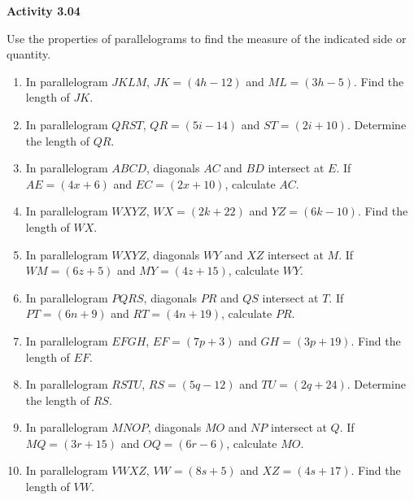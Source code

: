 \vspace{0.3ex}
\noindent\textbf{Activity 3.04}

\vspace{0.2ex}

\noindent Use the properties of parallelograms to find the measure of the indicated side or quantity.

\begin{enumerate}[label=\color{blue}\arabic*.]
    \item In parallelogram \(JKLM\), \(JK = (4h - 12)\) and \(ML = (3h - 5)\). Find the length of \(JK\).
    \item In parallelogram \(QRST\), \(QR = (5i - 14)\) and \(ST = (2i + 10)\). Determine the length of \(QR\).
    \item In parallelogram \(ABCD\), diagonals \(AC\) and \(BD\) intersect at \(E\). If \(AE = (4x + 6)\) and \(EC = (2x + 10)\), calculate \(AC\).
    \item In parallelogram \(WXYZ\), \(WX = (2k + 22)\) and \(YZ = (6k - 10)\). Find the length of \(WX\).
    \item In parallelogram \(WXYZ\), diagonals \(WY\) and \(XZ\) intersect at \(M\). If \(WM = (6z + 5)\) and \(MY = (4z + 15)\), calculate \(WY\).
    \item In parallelogram \(PQRS\), diagonals \(PR\) and \(QS\) intersect at \(T\). If \(PT = (6n + 9)\) and \(RT = (4n + 19)\), calculate \(PR\).
    \item In parallelogram \(EFGH\), \(EF = (7p + 3)\) and \(GH = (3p + 19)\). Find the length of \(EF\).
    \item In parallelogram \(RSTU\), \(RS = (5q - 12)\) and \(TU = (2q + 24)\). Determine the length of \(RS\).
    \item In parallelogram \(MNOP\), diagonals \(MO\) and \(NP\) intersect at \(Q\). If \(MQ = (3r + 15)\) and \(OQ = (6r - 6)\), calculate \(MO\).
    \item In parallelogram \(VWXZ\), \(VW = (8s + 5)\) and \(XZ = (4s + 17)\). Find the length of \(VW\).
\end{enumerate}
